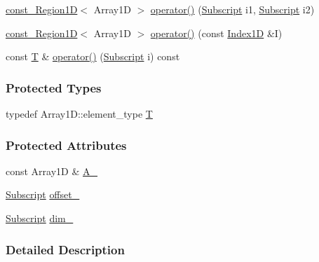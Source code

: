 \begin{DoxyCompactItemize}
\item 
\hyperlink{class_t_n_t_1_1const___region1_d}{const\_\-Region1D}$<$ Array1D $>$ \hyperlink{class_t_n_t_1_1const___region1_d_a992c3ec4ab7356ee38e7138acfa81839}{operator()} (\hyperlink{namespace_t_n_t_af22e3f1460e145c04ce4e7d701e4c1c1}{Subscript} i1, \hyperlink{namespace_t_n_t_af22e3f1460e145c04ce4e7d701e4c1c1}{Subscript} i2)
\item 
\hyperlink{class_t_n_t_1_1const___region1_d}{const\_\-Region1D}$<$ Array1D $>$ \hyperlink{class_t_n_t_1_1const___region1_d_a6a0af9dde80cc0cf3558971b54cb75ce}{operator()} (const \hyperlink{class_t_n_t_1_1_index1_d}{Index1D} \&I)
\item 
const \hyperlink{class_t_n_t_1_1const___region1_d_a1a33c802e205af1589967f56836bc434}{T} \& \hyperlink{class_t_n_t_1_1const___region1_d_af464ecd2d6a52471d2c387f66bdb73d6}{operator()} (\hyperlink{namespace_t_n_t_af22e3f1460e145c04ce4e7d701e4c1c1}{Subscript} i) const 
\end{DoxyCompactItemize}
\subsubsection*{Protected Types}
\begin{DoxyCompactItemize}
\item 
typedef Array1D::element\_\-type \hyperlink{class_t_n_t_1_1const___region1_d_a1a33c802e205af1589967f56836bc434}{T}
\end{DoxyCompactItemize}
\subsubsection*{Protected Attributes}
\begin{DoxyCompactItemize}
\item 
const Array1D \& \hyperlink{class_t_n_t_1_1const___region1_d_af3728b44cb958465eeb54e402d10d055}{A\_\-}
\item 
\hyperlink{namespace_t_n_t_af22e3f1460e145c04ce4e7d701e4c1c1}{Subscript} \hyperlink{class_t_n_t_1_1const___region1_d_a97e89ab75245ddb0b76bef4cb1421677}{offset\_\-}
\item 
\hyperlink{namespace_t_n_t_af22e3f1460e145c04ce4e7d701e4c1c1}{Subscript} \hyperlink{class_t_n_t_1_1const___region1_d_a73309057b2d08cd38c7b014e551d2cb3}{dim\_\-}
\end{DoxyCompactItemize}


\subsubsection{Detailed Description}
